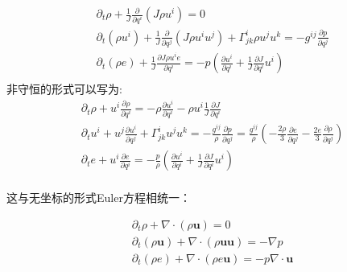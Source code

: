 \documentclass[LBMDerivation.tex]{subfiles}
\begin{document}
\begin{equation}
  \boxed{
    \begin{aligned}
       & \partial_{t} \rho+\frac{1}{J} \frac{\partial}{\partial q^{i}}\left(J \rho u^{i}\right)=0
      \\
       & \partial_{t}\left(\rho u^{i}\right)+\frac{1}{J} \frac{\partial}{\partial q^{j}}\left(J \rho u^{i} u^{j}\right)+\Gamma_{j k}^{i} \rho u^{j} u^{k}=-g^{i j} \frac{\partial p}{\partial q^{j}} \\
       & \partial_{t}\left(\rho e\right) + \frac{1}{J}\frac{\partial J \rho u^i e}{\partial  q^{i}}  = -  p (\frac{\partial  u^i}{\partial q^{i}}  + \frac{1}{J} \frac{\partial J}{\partial q^i}u^i) \\
    \end{aligned}
  }
  \label{EQUATION::Eluer} ~
\end{equation}
%
%
非守恒的形式可以写为:
\begin{equation}
  \begin{aligned}
     & \partial_{t} \rho+ u^i \frac{\partial \rho}{\partial q^i}=-\rho \frac{\partial u^i}{\partial q^i}-\rho u^i \frac{1}{J} \frac{\partial J}{\partial q^i}
    \\
     & \partial_{t}u^{i}+u^j \frac{\partial u^i}{\partial q^{j}}+\Gamma_{j k}^{i}  u^{j} u^{k}=-\frac{g^{i j}}{\rho} \frac{\partial p}{\partial q^{j}}= \frac{g^{i j}}{\rho} (-\frac{2\rho}{3}\frac{\partial e}{\partial q^j} - \frac{2e}{3}\frac{\partial \rho}{\partial q^j}) \\
     & \partial_{t}e + u^i\frac{\partial e}{\partial  q^{i}}  = -  \frac{p}{\rho} (\frac{\partial  u^i}{\partial q^{i}}  + \frac{1}{J} \frac{\partial J}{\partial q^i}u^i)                                                                                                      \\
  \end{aligned}
  \label{EQUATION::Eluer非守恒} ~
\end{equation}


这与无坐标的形式Euler方程相统一：


\begin{equation}
  \begin{aligned}
     & \partial_t \rho + \nabla \cdot (\rho \boldsymbol{u})=0                                                      \\
     & \partial_{t}\left(\rho \boldsymbol{u} \right)+ \nabla \cdot (\rho \boldsymbol{u} \boldsymbol{u}) =-\nabla p \\
     & \partial_{t}\left(\rho e \right) + \nabla \cdot (\rho e \boldsymbol{u})=-p \nabla \cdot \boldsymbol{u}      \\
  \end{aligned}
  \label{EQUATION::Eluer2} ~
\end{equation}
%
%
%
%
%
%
\end{document}

